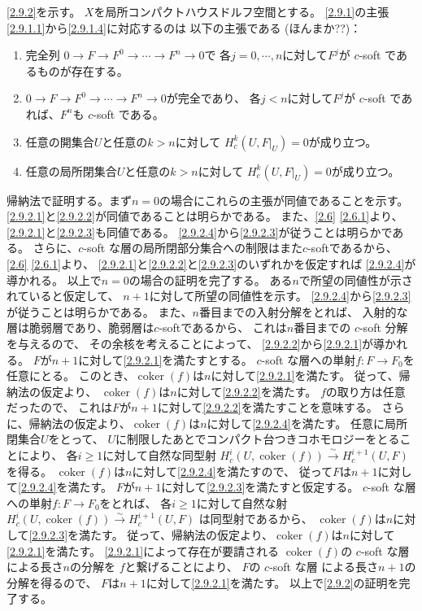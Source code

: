 \documentclass[uplatex,dvipdfmx]{jsarticle}
\makeatletter
\theoremstyle{definition}
\renewenvironment{proof}[1][\proofname]{
  \pushQED{\qed}%
  \normalfont \topsep6\p@\@plus6\p@\relax
  \trivlist
  \item[\hskip\labelsep
    #1\@addpunct{\textbf{.}}]\ignorespaces
}{%
  \popQED\endtrivlist\@endpefalse
}
\providecommand{\proofname}{証明}
\DeclareMathOperator{\coker}{\mathrm{coker}}
\makeatother
\begin{document}
\begin{proof}
  \ref{2.9.2}を示す。
  \(X\)を局所コンパクトハウスドルフ空間とする。
  \ref{2.9.1}の主張\ref{2.9.1.1}から\ref{2.9.1.4}に対応するのは
  以下の主張である (ほんまか??)：
  \begin{enumerate}
    \item \label{2.9.2.1}
    完全列
    \(0\to F\to F^0\to \cdots \to F^n\to 0\)で
    各\(j=0,\cdots,n\)に対して\(F^j\)が \(c\)-soft であるものが存在する。
    \item \label{2.9.2.2}
    \(0\to F\to F^0\to \cdots \to F^n\to 0\)が完全であり、
    各\(j<n\)に対して\(F^j\)が \(c\)-soft であれば、\(F^n\)も \(c\)-soft である。
    \item \label{2.9.2.3}
    任意の開集合\(U\)と任意の\(k>n\)に対して
    \(H^k_c(U,F|_U)=0\)が成り立つ。
    \item \label{2.9.2.4}
    任意の局所閉集合\(U\)と任意の\(k>n\)に対して
    \(H^k_c(U,F|_U)=0\)が成り立つ。
  \end{enumerate}
  帰納法で証明する。まず\(n=0\)の場合にこれらの主張が同値であることを示す。
  \ref{2.9.2.1}と\ref{2.9.2.2}が同値であることは明らかである。
  また、\autoref{2.6} \ref{2.6.1}より、
  \ref{2.9.2.1}と\ref{2.9.2.3}も同値である。
  \ref{2.9.2.4}から\ref{2.9.2.3}が従うことは明らかである。
  さらに、\(c\)-soft な層の局所閉部分集合への制限はまた\(c\)-softであるから、
  \autoref{2.6} \ref{2.6.1}より、
  \ref{2.9.2.1}と\ref{2.9.2.2}と\ref{2.9.2.3}のいずれかを仮定すれば
  \ref{2.9.2.4}が導かれる。
  以上で\(n=0\)の場合の証明を完了する。
  ある\(n\)で所望の同値性が示されていると仮定して、
  \(n+1\)に対して所望の同値性を示す。
  \ref{2.9.2.4}から\ref{2.9.2.3}が従うことは明らかである。
  また、\(n\)番目までの入射分解をとれば、
  入射的な層は脆弱層であり、脆弱層は\(c\)-softであるから、
  これは\(n\)番目までの \(c\)-soft 分解を与えるので、
  その余核を考えることによって、
  \ref{2.9.2.2}から\ref{2.9.2.1}が導かれる。
  \(F\)が\(n+1\)に対して\ref{2.9.2.1}を満たすとする。
  \(c\)-soft な層への単射\(f:F\to F_0\)を任意にとる。
  このとき、\(\coker(f)\)は\(n\)に対して\ref{2.9.2.1}を満たす。
  従って、帰納法の仮定より、
  \(\coker(f)\)は\(n\)に対して\ref{2.9.2.2}を満たす。
  \(f\)の取り方は任意だったので、
  これは\(F\)が\(n+1\)に対して\ref{2.9.2.2}を満たすことを意味する。
  さらに、帰納法の仮定より、\(\coker(f)\)は\(n\)に対して\ref{2.9.2.4}を満たす。
  任意に局所閉集合\(U\)をとって、
  \(U\)に制限したあとでコンパクト台つきコホモロジーをとることにより、
  各\(i\geq 1\)に対して自然な同型射
  \(H^i_c(U,\coker(f)) \xrightarrow{\sim} H^{i+1}_c(U,F)\)
  を得る。
  \(\coker(f)\)は\(n\)に対して\ref{2.9.2.4}を満たすので、
  従って\(F\)は\(n+1\)に対して\ref{2.9.2.4}を満たす。
  \(F\)が\(n+1\)に対して\ref{2.9.2.3}を満たすと仮定する。
  \(c\)-soft な層への単射\(f:F\to F_0\)をとれば、
  各\(i\geq 1\)に対して自然な射
  \(H^i_c(U,\coker(f)) \xrightarrow{\sim} H^{i+1}_c(U,F)\)
  は同型射であるから、
  \(\coker(f)\)は\(n\)に対して\ref{2.9.2.3}を満たす。
  従って、帰納法の仮定より、\(\coker(f)\)は\(n\)に対して\ref{2.9.2.1}を満たす。
  \ref{2.9.2.1}によって存在が要請される
  \(\coker(f)\)の \(c\)-soft な層による長さ\(n\)の分解を
  \(f\)と繋げることにより、
  \(F\)の \(c\)-soft な層 による長さ\(n+1\)の分解を得るので、
  \(F\)は\(n+1\)に対して\ref{2.9.2.1}を満たす。
  以上で\ref{2.9.2}の証明を完了する。


\end{proof}
\end{document}
